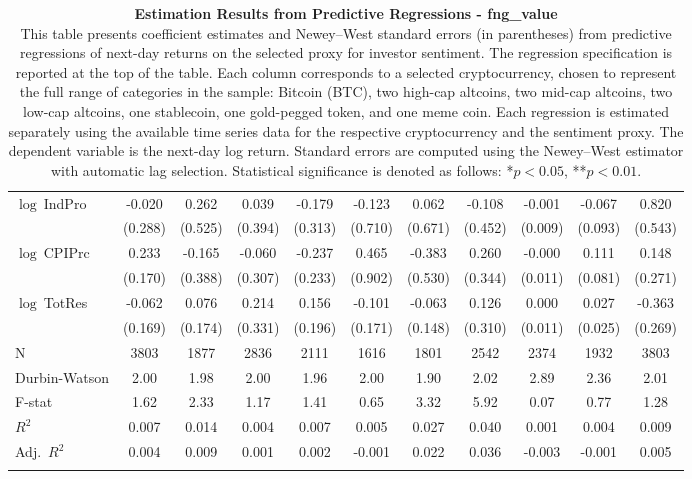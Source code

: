 \begin{table}[ht]
\begin{tabular}{l *{10}{c}}
\addlinespace
$\log\ $IndPro & -0.020 & 0.262 & 0.039 & -0.179 & -0.123 & 0.062 & -0.108 & -0.001 & -0.067 & 0.820 \\
 & (0.288) & (0.525) & (0.394) & (0.313) & (0.710) & (0.671) & (0.452) & (0.009) & (0.093) & (0.543) \\
\addlinespace
$\log\ $CPIPrc & 0.233 & -0.165 & -0.060 & -0.237 & 0.465 & -0.383 & 0.260 & -0.000 & 0.111 & 0.148 \\
 & (0.170) & (0.388) & (0.307) & (0.233) & (0.902) & (0.530) & (0.344) & (0.011) & (0.081) & (0.271) \\
\addlinespace
$\log\ $TotRes & -0.062 & 0.076 & 0.214 & 0.156 & -0.101 & -0.063 & 0.126 & 0.000 & 0.027 & -0.363 \\
 & (0.169) & (0.174) & (0.331) & (0.196) & (0.171) & (0.148) & (0.310) & (0.011) & (0.025) & (0.269) \\
\addlinespace
\midrule
N & 3803 & 1877 & 2836 & 2111 & 1616 & 1801 & 2542 & 2374 & 1932 & 3803 \\
Durbin-Watson & 2.00 & 1.98 & 2.00 & 1.96 & 2.00 & 1.90 & 2.02 & 2.89 & 2.36 & 2.01 \\
F-stat & 1.62 & 2.33 & 1.17 & 1.41 & 0.65 & 3.32 & 5.92 & 0.07 & 0.77 & 1.28 \\
\(R^2\) & 0.007 & 0.014 & 0.004 & 0.007 & 0.005 & 0.027 & 0.040 & 0.001 & 0.004 & 0.009 \\
Adj.\ \(R^2\) & 0.004 & 0.009 & 0.001 & 0.002 & -0.001 & 0.022 & 0.036 & -0.003 & -0.001 & 0.005 \\
\addlinespace
\midrule
\multicolumn{11}{c}{Specification tested: $R_{i,t+1} = \alpha_i + \beta_{sent} S_t + \phi R_{i,t} + \theta B_{i,t} + \gamma M_t + \varepsilon_{i,t+1}$}\\
\bottomrule
\end{tabular}
\caption{\textbf{Estimation Results from Predictive Regressions - fng_value} \\
This table presents coefficient estimates and Newey--West standard errors (in parentheses) from predictive regressions of next-day returns on the selected proxy for investor sentiment. The regression specification is reported at the top of the table. Each column corresponds to a selected cryptocurrency, chosen to represent the full range of categories in the sample: Bitcoin (BTC), two high-cap altcoins, two mid-cap altcoins, two low-cap altcoins, one stablecoin, one gold-pegged token, and one meme coin. Each regression is estimated separately using the available time series data for the respective cryptocurrency and the sentiment proxy. The dependent variable is the next-day log return. Standard errors are computed using the Newey--West estimator with automatic lag selection. Statistical significance is denoted as follows: *$p<0.05$, **$p<0.01$.}
\label{tab:fng_value_result_h1}
\end{table}